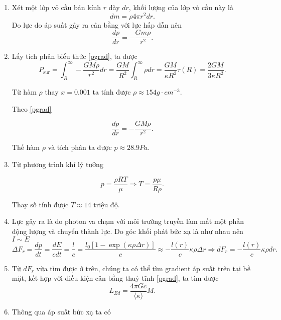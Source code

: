 \begin{enumerate}
\item Xét một lớp vỏ cầu bán kính $r$ dày $dr$, khối lượng của lớp vỏ cầu này là
\begin{equation}
    dm=\rho 4 \pi r^2 dr .\label{mgrad}
\end{equation}
Do lực do áp suất gây ra cân bằng với lực hấp dẫn nên
\begin{equation}
    \dfrac{dp}{dr}= -\dfrac{Gm \rho}{r^2} .
    \label{pgrad}
\end{equation}

\item Lấy tích phân biểu thức \eqref{pgrad}, ta được
\begin{equation}
    P_\text{sur}= \int_{R}^{\infty} -\dfrac{GM\rho}{r^2} dr = \dfrac{GM}{R^2} \int_{R}^{\infty} \rho dr = \dfrac{GM}{\kappa R^2} \tau(R) =\dfrac{2GM}{3\kappa R^2}.\label{psur}
\end{equation}

Từ hàm $\rho$ thay $x=0.001$ ta tính được $\rho \approx 154 \si{g\cdot cm^{-3}}$.

Theo \eqref{pgrad}

\begin{equation}
    \dfrac{dp}{dr}= -\dfrac{GM \rho}{r^2}.\label{pcore}
\end{equation}

Thế hàm $\rho$ và tích phân ta được $p\approx 28.9 Pa$.

\item Từ phương trình khí lý tưởng

\begin{equation}
    p =\dfrac{\rho R T}{\mu} \Longrightarrow T= \dfrac{p \mu}{R \rho}.\label{tempcore}
\end{equation}


Thay số tính được $T \approx 14$ triệu độ.

\item Lực gây ra là do photon va chạm với môi trường truyền làm mất một phần động lượng và chuyển thành lực. Do góc khối phát bức xạ là như nhau nên $I\sim E$
\begin{equation}
    \Delta F_r =\dfrac{dp}{dt} = \dfrac{dE}{cdt}=\dfrac{l}{c} = \dfrac{l_0 [1-\exp{(\kappa \rho \Delta r)} ] }{c} \approx -\dfrac{l(r)}{c} \kappa \rho \Delta r \Longrightarrow dF_r = -\dfrac{l(r)}{c} \kappa \rho dr.\label{dfrad}
\end{equation}
\item Từ $dF_r$ vừa tìm được ở trên, chúng ta có thể tìm gradient áp suất trên tại bề mặt, kết hợp với điều kiện cân bằng thuỷ tĩnh \eqref{pgrad}, ta tìm được
\begin{equation}
    L_{Ed}=\dfrac{4\pi Gc}{\langle \kappa \rangle} M.\label{leddington}
\end{equation}
\item Thông qua áp suất bức xạ ta có


\end{enumerate}
